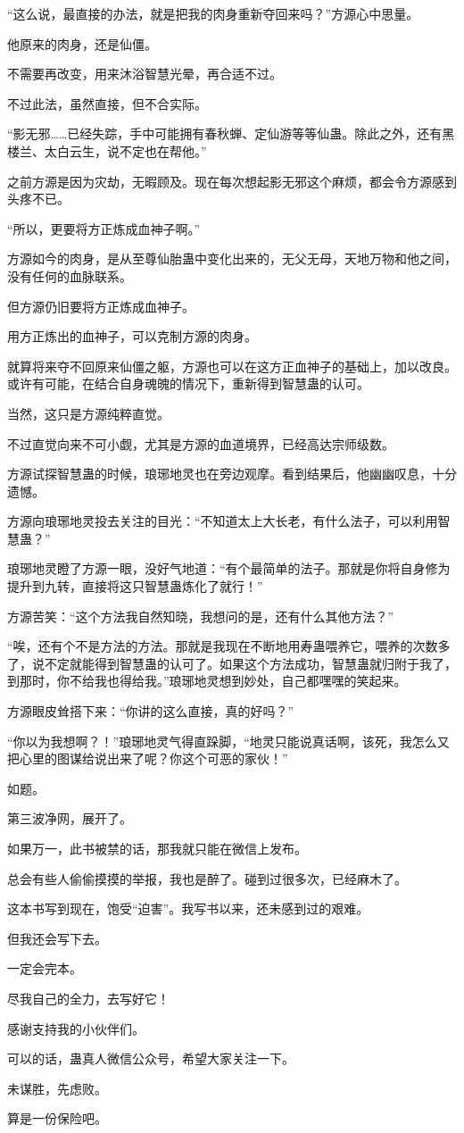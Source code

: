\begin{this_body}
“这么说，最直接的办法，就是把我的肉身重新夺回来吗？”方源心中思量。

他原来的肉身，还是仙僵。

不需要再改变，用来沐浴智慧光晕，再合适不过。

不过此法，虽然直接，但不合实际。

“影无邪……已经失踪，手中可能拥有春秋蝉、定仙游等等仙蛊。除此之外，还有黑楼兰、太白云生，说不定也在帮他。”

之前方源是因为灾劫，无暇顾及。现在每次想起影无邪这个麻烦，都会令方源感到头疼不已。

“所以，更要将方正炼成血神子啊。”

方源如今的肉身，是从至尊仙胎蛊中变化出来的，无父无母，天地万物和他之间，没有任何的血脉联系。

但方源仍旧要将方正炼成血神子。

用方正炼出的血神子，可以克制方源的肉身。

就算将来夺不回原来仙僵之躯，方源也可以在这方正血神子的基础上，加以改良。或许有可能，在结合自身魂魄的情况下，重新得到智慧蛊的认可。

当然，这只是方源纯粹直觉。

不过直觉向来不可小觑，尤其是方源的血道境界，已经高达宗师级数。

方源试探智慧蛊的时候，琅琊地灵也在旁边观摩。看到结果后，他幽幽叹息，十分遗憾。

方源向琅琊地灵投去关注的目光：“不知道太上大长老，有什么法子，可以利用智慧蛊？”

琅琊地灵瞪了方源一眼，没好气地道：“有个最简单的法子。那就是你将自身修为提升到九转，直接将这只智慧蛊炼化了就行！”

方源苦笑：“这个方法我自然知晓，我想问的是，还有什么其他方法？”

“唉，还有个不是方法的方法。那就是我现在不断地用寿蛊喂养它，喂养的次数多了，说不定就能得到智慧蛊的认可了。如果这个方法成功，智慧蛊就归附于我了，到那时，你不给我也得给我。”琅琊地灵想到妙处，自己都嘿嘿的笑起来。

方源眼皮耸搭下来：“你讲的这么直接，真的好吗？”

“你以为我想啊？！”琅琊地灵气得直跺脚，“地灵只能说真话啊，该死，我怎么又把心里的图谋给说出来了呢？你这个可恶的家伙！”

\end{this_body}
\begin{this_body} \par
如题。

第三波净网，展开了。

如果万一，此书被禁的话，那我就只能在微信上发布。

总会有些人偷偷摸摸的举报，我也是醉了。碰到过很多次，已经麻木了。

这本书写到现在，饱受“迫害”。我写书以来，还未感到过的艰难。

但我还会写下去。

一定会完本。

尽我自己的全力，去写好它！

感谢支持我的小伙伴们。

可以的话，蛊真人微信公众号，希望大家关注一下。

未谋胜，先虑败。

算是一份保险吧。

\end{this_body}

